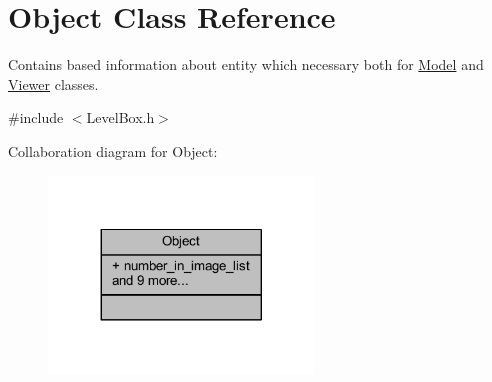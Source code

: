 \hypertarget{class_object}{}\section{Object Class Reference}
\label{class_object}


Contains based information about entity which necessary both for \hyperlink{class_model}{Model} and \hyperlink{class_viewer}{Viewer} classes.  




{\ttfamily \#include $<$Level\+Box.\+h$>$}



Collaboration diagram for Object\+:\nopagebreak
\begin{figure}[H]
\begin{center}
\leavevmode
\includegraphics[width=200pt]{class_object__coll__graph}
\end{center}
\end{figure}
